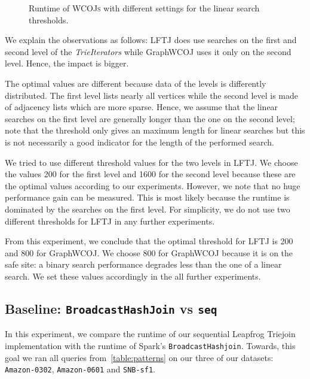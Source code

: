 \begin{figure}
    \centering
    \caption{Runtime of \textsc{WCOJs} with different settings for the linear search thresholds.}
    \label{fig:linear-search-threshold}
\end{figure}

We explain the observations as follows: \textsc{LFTJ} does use searches on the first
and second level of the \textit{TrieIterators} while GraphWCOJ uses it only on the second
level.
Hence, the impact is bigger.

The optimal values are different because data of the levels is differently distributed.
The first level lists nearly all vertices while the second level is made of adjacency lists which are more
sparse.
Hence, we assume that the linear searches on the first level are generally longer than
the one on the second level;
note that the threshold only gives an maximum length for linear searches but this is not
necessarily a good indicator for the length of the performed search.

We tried to use different threshold values for the two levels in \textsc{LFTJ}.
We choose the values 200 for the first level and 1600 for the second level because these
are the optimal values according to our experiments.
However, we note that no huge performance gain can be measured.
This is most likely because the runtime is dominated by the searches on the first level.
For simplicity, we do not use two different thresholds for \textsc{LFTJ} in any further experiments.

From this experiment, we conclude that the optimal threshold for \textsc{LFTJ} is 200 and 800
for GraphWCOJ.
We choose 800 for GraphWCOJ because it is on the safe site:
a binary search performance degrades less than the one of a linear search.
We set these values accordingly in the all further experiments.


\subsection{Baseline: \texttt{BroadcastHashJoin} vs \texttt{seq}} \label{subsec:spark-vs-lftj}
In this experiment, we compare the runtime of our sequential Leapfrog Triejoin implementation with the runtime of Spark's \texttt{BroadcastHashjoin}.
Towards, this goal we ran all queries from~\cref{table:patterns} on our three of our datasets: \texttt{Amazon-0302}, \texttt{Amazon-0601}
and
\texttt{SNB-sf1}.


